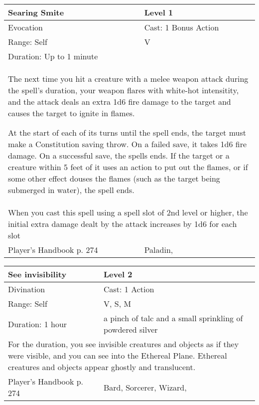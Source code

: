 \documentclass[11pt]{report}
\begin{document}
\begin{table}[H]
	\begin{tabular}{||p{6cm}|p{6cm}||}
		\hline\hline
		\bf{Searing Smite} & Level 1\\ \hline
		Evocation & Cast: 1 Bonus Action\\ \hline
		Range: Self & V\\ \hline
		Duration: Up to 1 minute & \\ \hline
		\multicolumn{2}{||p{12cm}||}{The next time you hit a creature with a melee weapon attack during the spell’s duration, your weapon flares with white-hot intensitity, and the attack deals an extra 1d6 fire damage to the target and causes the target to ignite in flames.

At the start of each of its turns until the spell ends, the target must make a Constitution saving throw. On a failed save, it takes 1d6 fire damage. On a successful save, the spells ends. If the target or a creature within 5 feet of it uses an action to put out the flames, or if some other effect douses the flames (such as the target being submerged in water), the spell ends.}\\ \hline
		\multicolumn{2}{||p{12cm}||}{When you cast this spell using a spell slot of 2nd level or higher, the initial extra damage dealt by the attack increases by 1d6 for each slot}\\ \hline
Player's Handbook p. 274 & Paladin, \\ \hline\hline
	\end{tabular}
\end{table}

\begin{table}[H]
	\begin{tabular}{||p{6cm}|p{6cm}||}
		\hline\hline
		\bf{See invisibility} & Level 2\\ \hline
		Divination & Cast: 1 Action\\ \hline
		Range: Self & V, S, M\\ \hline
		Duration: 1 hour & a pinch of talc and a small sprinkling of powdered silver\\ \hline
		\multicolumn{2}{||p{12cm}||}{For the duration, you see invisible creatures and objects as if they were visible, and you can see into the Ethereal Plane. Ethereal creatures and objects appear ghostly and translucent.}\\ \hline
Player's Handbook p. 274 & Bard, Sorcerer, Wizard, \\ \hline\hline
	\end{tabular}
\end{table}
\end{document}
